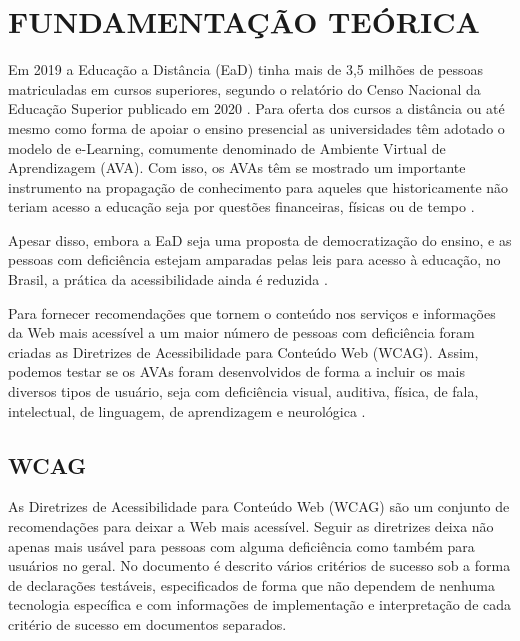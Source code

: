 \documentclass[
	12pt,				%
	openright,			%
	oneside,			%
	a4paper,			%
	chapter=TITLE,		%
	section=TITLE,		%
	subsection=TITLE,	%
	subsubsection=TITLE,%
	english,			%
	brazil				%
	]{abntex2}
\theoremstyle{definition}
\begin{document}
\chapter{FUNDAMENTAÇÃO TEÓRICA}

Em 2019 a Educação a Distância (EaD) tinha mais de 3,5 milhões de pessoas matriculadas em cursos superiores, segundo o relatório do Censo Nacional da Educação Superior publicado em 2020 \cite{da2019notas}. Para oferta dos cursos a distância ou até mesmo como forma de apoiar o ensino presencial as universidades têm adotado o modelo de e-Learning, comumente denominado de Ambiente Virtual de Aprendizagem (AVA). Com isso, os AVAs têm se mostrado um importante instrumento na propagação de conhecimento para aqueles que historicamente não teriam acesso a educação seja por questões financeiras, físicas ou de tempo \cite{sharma2014quantitative}.

Apesar disso, embora a EaD seja uma proposta de democratização do ensino, e as pessoas com deficiência estejam amparadas pelas leis para acesso à educação, no Brasil, a prática da acessibilidade ainda é reduzida \cite{dos2021acessibilidade}.


Para fornecer recomendações que tornem o conteúdo nos serviços e informações da Web mais acessível a um maior número de pessoas com deficiência foram criadas as Diretrizes de Acessibilidade para Conteúdo Web (WCAG). Assim, podemos testar se os AVAs foram desenvolvidos de forma a incluir os mais diversos tipos de usuário, seja com deficiência visual, auditiva, física, de fala, intelectual, de linguagem, de aprendizagem e neurológica \cite{caldwell2008web}.

\section{WCAG}
 
As Diretrizes de Acessibilidade para Conteúdo Web (WCAG) são um conjunto de recomendações para deixar a Web mais acessível. Seguir as diretrizes deixa não apenas mais usável para pessoas com alguma deficiência como também para usuários no geral. No documento é descrito vários critérios de sucesso sob a forma de declarações testáveis, especificados de forma que não dependem de nenhuma tecnologia específica e com informações de implementação e interpretação de cada critério de sucesso em documentos separados.
\end{document}
